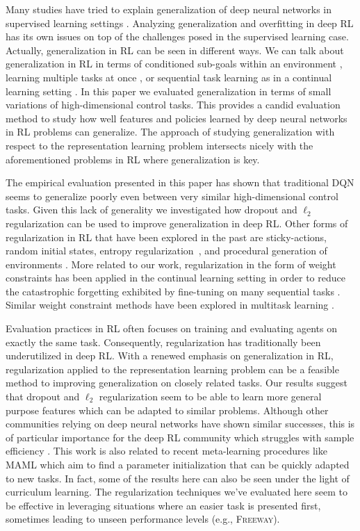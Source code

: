 \documentclass{article}
\begin{document}
Many studies have tried to explain generalization of deep neural networks in supervised learning settings \citep[e.g.,][]{Zhang18, Dinh17}. Analyzing generalization and overfitting in deep RL has its own issues on top of the challenges posed in the supervised learning case.
Actually, generalization in RL can be seen in different ways.
We can talk about generalization in RL in terms of conditioned sub-goals within an environment \citep[e.g.,][]{Andrychowicz17, Sutton95}, learning multiple tasks at once \citep[e.g.,][]{Teh17, Parisotto16}, or sequential task learning as in a continual learning setting \citep[e.g.,][]{Schwarz18, Kirkpatrick16}.
In this paper we evaluated generalization in terms of small variations of high-dimensional control tasks. This provides a candid evaluation method to study how well features and policies learned by deep neural networks in RL problems can generalize. The approach of studying generalization with respect to the representation learning problem intersects nicely with the aforementioned problems in RL where generalization is key.


The empirical evaluation presented in this paper has shown that traditional DQN seems to generalize poorly even between very similar high-dimensional control tasks. Given this lack of generality we investigated how dropout and $\ell_2$ regularization can be used to improve generalization in deep RL. Other forms of regularization in RL that have been explored in the past are sticky-actions, random initial states, entropy regularization~\citep{Zhang18}, and procedural generation of environments \citep{Justesen2018}. More related to our work, regularization in the form of weight constraints has been applied in the continual learning setting in order to reduce the catastrophic forgetting exhibited by fine-tuning on many sequential tasks \citep{Kirkpatrick16, Schwarz18}.
Similar weight constraint methods have been explored in multitask learning \citep{Teh17}.

Evaluation practices in RL often focuses on training and evaluating agents on exactly the same task. Consequently, regularization has traditionally been underutilized in deep RL. With a renewed emphasis on generalization in RL, regularization applied to the representation learning problem can be a feasible method to improving generalization on closely related tasks.
Our results suggest that dropout and $\ell_2$ regularization seem to be able to learn more general purpose features which can be adapted to similar problems. Although other communities relying on deep neural networks have shown similar successes, this is of particular importance for the deep RL community which struggles with sample efficiency \citep{Henderson17}. This work is also related to recent meta-learning procedures like MAML \citep{Finn17} which aim to find a parameter initialization that can be quickly adapted to new tasks.
In fact, some of the results here can also be seen under the light of curriculum learning. The regularization techniques we've evaluated here seem to be effective in leveraging situations where an easier task is presented first, sometimes leading to unseen performance levels (e.g., \textsc{Freeway}).
\end{document}

